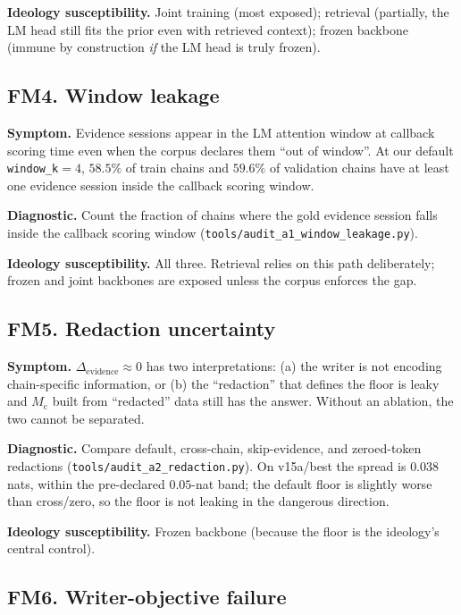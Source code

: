 \documentclass{article}
\newcommand{\Mc}{M_{\mathrm{c}}}
\newcommand{\elift}{\Delta_{\mathrm{evidence}}}
\begin{document}
\textbf{Ideology susceptibility.}  Joint training (most exposed);
retrieval (partially, the LM head still fits the prior even with
retrieved context); frozen backbone (immune by construction \emph{if}
the LM head is truly frozen).

\subsection{FM4.  Window leakage}
\label{sec:fm4}

\textbf{Symptom.}  Evidence sessions appear in the LM attention
window at callback scoring time even when the corpus declares them
``out of window''.  At our default \texttt{window\_k}$=4$, $58.5\%$
of train chains and $59.6\%$ of validation chains have at least one
evidence session inside the callback scoring window.

\textbf{Diagnostic.}  Count the fraction of chains where the gold
evidence session falls inside the callback scoring window
(\texttt{tools/audit\_a1\_window\_leakage.py}).

\textbf{Ideology susceptibility.}  All three.  Retrieval relies on
this path deliberately; frozen and joint backbones are exposed
unless the corpus enforces the gap.

\subsection{FM5.  Redaction uncertainty}
\label{sec:fm5}

\textbf{Symptom.}  $\elift \approx 0$ has two interpretations: (a)
the writer is not encoding chain-specific information, or (b) the
``redaction'' that defines the floor is leaky and $\Mc$ built from
``redacted'' data still has the answer.  Without an ablation, the
two cannot be separated.

\textbf{Diagnostic.}  Compare default, cross-chain, skip-evidence, and
zeroed-token redactions (\texttt{tools/audit\_a2\_redaction.py}).
On v15a/best the spread is $0.038$ nats, within the pre-declared
$0.05$-nat band; the default floor is slightly worse than cross/zero,
so the floor is not leaking in the dangerous direction.

\textbf{Ideology susceptibility.}  Frozen backbone (because the floor
is the ideology's central control).

\subsection{FM6.  Writer-objective failure}
\label{sec:fm6}
\end{document}
